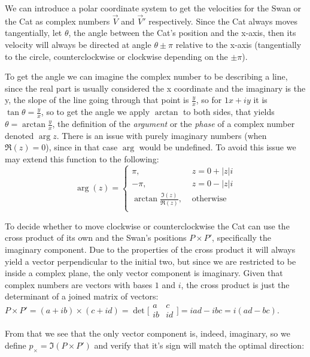 \documentclass[12pt]{article}
\begin{document}
We can introduce a polar coordinate system to get the velocities for the Swan or the Cat as complex numbers $\vec{V}$ and $\vec{V}'$ respectively. Since the Cat always moves tangentially, let $\theta$, the angle between the Cat's position and the x-axis, then its velocity will always be directed at angle $\theta \pm \pi$ relative to the x-axis (tangentially to the circle, counterclockwise or clockwise depending on the $\pm \pi$).

To get the angle we can imagine the complex number to be describing a line, since the real part is usually considered the x coordinate and the imaginary is the y, the slope of the line going through that point is $\frac{y}{x}$, so for $1x + iy$ it is $\tan \theta = \frac{y}{x}$, so to get the angle we apply $\arctan$ to both sides, that yields $\theta = \arctan{\frac{y}{x}}$, the definition of the \textit{argument} or the \textit{phase} of a complex number denoted $\arg z$. There is an issue with purely imaginary numbers (when $\Re (z) = 0$), since in that case $\arg$ would be undefined. To avoid this issue we may extend this function to the following: $$
\arg (z) = \left\{ 
		\begin{aligned}
			\pi						,\hspace{4pt}&  z = 0 + |z|i\\
			-\pi					,\hspace{4pt}&  z = 0 - |z|i\\
			\arctan {\frac{\Im (z)}{\Re (z)}}	,\hspace{4pt}&	\text{otherwise}\\
		\end{aligned}
	\right.$$

To decide whether to move clockwise or counterclockwise the Cat can use the cross product of its own and the Swan's positions $P \times P'$, specifically the imaginary component. Due to the properties of the cross product it will always yield a vector perpendicular to the initial two, but since we are restricted to be inside a complex plane, the only vector component is imaginary. Given that complex numbers are vectors with bases $1$ and $i$, the cross product is just the determinant of a joined matrix of vectors: $P \times P' = (a + ib) \times (c + id) = \det \bigl[ \begin{smallmatrix} 
	a & c\\
	ib & id 
  \end{smallmatrix} \bigr] = iad - ibc = i(ad - bc)$.

From that we see that the only vector component is, indeed, imaginary, so we define $p_\times = \Im{(P \times P')}$ and verify that it's sign will match the optimal direction:
\end{document}
